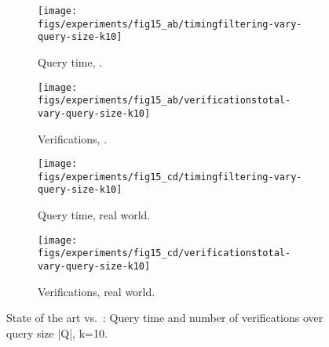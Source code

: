 \begin{figure*}[ht!]
  \centering
  \begin{subfigure}[b]{0.225\textwidth}
    \centering
    \texttt{[image: figs/experiments/fig15\_ab/timingfiltering-vary-query-size-k10]}
    \caption{Query time, .}
    \label{fig:xmark-querysize-time}
  \end{subfigure}
  \quad
  \begin{subfigure}[b]{0.225\textwidth}
    \centering
    \texttt{[image: figs/experiments/fig15\_ab/verificationstotal-vary-query-size-k10]}
    \caption{Verifications, .}
    \label{fig:xmark-querysize-verifications}
  \end{subfigure}
  \quad
  \begin{subfigure}[b]{0.225\textwidth}
    \centering
    \texttt{[image: figs/experiments/fig15\_cd/timingfiltering-vary-query-size-k10]}
    \caption{Query time, real world.}
    \label{fig:tasm-struct-slim-timingfiltering-vary-query-size-k10-realworld}
  \end{subfigure}
  \quad
  \begin{subfigure}[b]{0.225\textwidth}
    \centering
    \texttt{[image: figs/experiments/fig15\_cd/verificationstotal-vary-query-size-k10]}
    \caption{Verifications, real world.}
    \label{fig:tasm-struct-slim-verificationstotal-vary-query-size-k10-realworld}
  \end{subfigure}
  \caption{State of the art vs.\ \shinconeshort{}: Query time and number of verifications over query size |Q|, k=10.}
  \label{fig:tasm-struct-slim-timingfiltering-verificationstotal-vary-query-size-k10}
\end{figure*}


